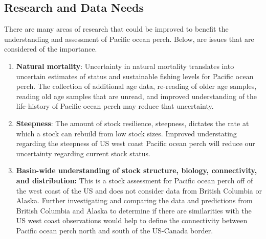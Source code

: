 \documentclass[12pt,]{article}
\begin{document}
\subsection*{Research and Data Needs}\label{research-and-data-needs}

There are many areas of research that could be improved to benefit the
understanding and assessment of Pacific ocean perch. Below, are issues
that are considered of the importance.

\begin{enumerate}

\item \textbf{Natural mortality}: Uncertainty in natural mortality translates into uncertain estimates of status and sustainable fishing levels for Pacific ocean perch. The collection of additional age data, re-reading of older age samples, reading old age samples that are unread, and improved understanding of the life-history of Pacific ocean perch may reduce that uncertainty.

\item \textbf{Steepness}: The amount of stock resilience, steepness, dictates the rate at which a stock can rebuild from low stock sizes.  Improved understating regarding the steepness of US west coast Pacific ocean perch will reduce our uncertainty regarding current stock status.

\item \textbf{Basin-wide understanding of stock structure, biology, connectivity, and distribution:} This is a stock assessment for Pacific ocean perch off of the west coast of the US and does not consider data from British Columbia or Alaska. Further investigating and comparing the data and predictions from British Columbia and Alaska to determine if there are similarities with the US west coast observations would help to define the connectivity between Pacific ocean perch north and south of the US-Canada border.
 

\end{enumerate}
\end{document}
